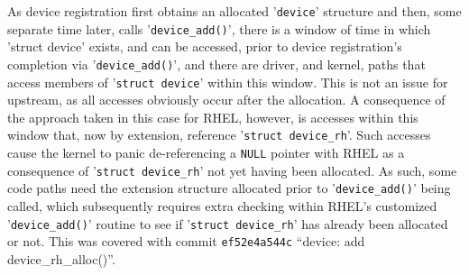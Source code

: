 \documentclass[10pt,oneside,english]{book}
\begin{document}

As device registration first obtains an allocated '\texttt{device}'
structure and then, some separate time later, calls '\texttt{device\_add()}',
there is a window of time in which 'struct device' exists, and can
be accessed, prior to device registration's completion via '\texttt{device\_add()}',
and there are driver, and kernel, paths that access members of '\texttt{struct
device}' within this window. This is not an issue for upstream, as
all accesses obviously occur after the allocation. A consequence of
the approach taken in this case for RHEL, however, is accesses within
this window that, now by extension, reference '\texttt{struct device\_rh}'.
Such accesses cause the kernel to panic de-referencing a \texttt{NULL}
pointer with RHEL as a consequence of '\texttt{struct device\_rh}'
not yet having been allocated. As such, some code paths need the extension
structure allocated prior to '\texttt{device\_add()}' being called,
which subsequently requires extra checking within RHEL's customized
'\texttt{device\_add()}' routine to see if '\texttt{struct device\_rh}'
has already been allocated or not. This was covered with commit \texttt{ef52e4a544c}
``device: add device\_rh\_alloc()''.
\end{document}
